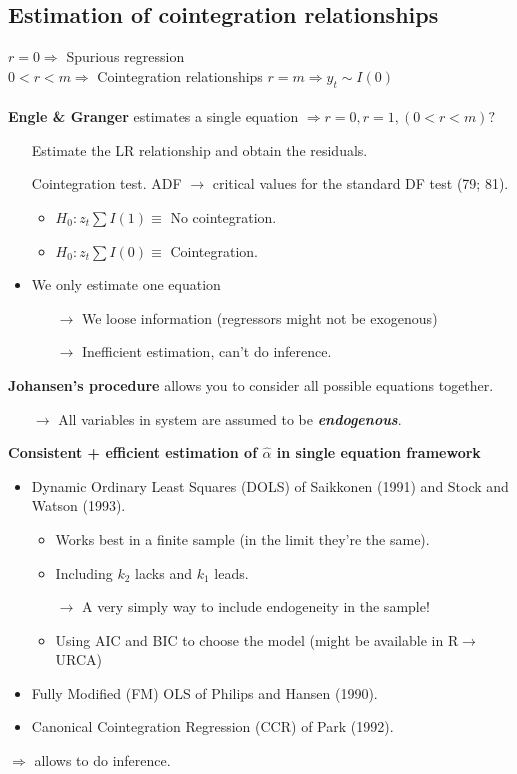 \begin{multicols}{2}
\subsection{Estimation of cointegration relationships}
$r=0\Rightarrow$ Spurious regression\\
$0<r<m\Rightarrow$ Cointegration relationships
$r=m\Rightarrow y_t\sim I(0)$
\\ \\
\textbf{Engle \& Granger} estimates a single equation $\Rightarrow r=0, r=1, (0<r<m)?$\\
\begin{itemize}
  \item[\nth{1}] Estimate the LR relationship and obtain the residuals.
  \item[\nth{2}] Cointegration test. ADF $\rightarrow$ critical values for the standard DF test (79; 81).
  \begin{itemize}
    \item $H_0: z_t\sum I(1)\equiv$ No cointegration.
    \item $H_0: z_t\sum I(0)\equiv$ Cointegration.
  \end{itemize}
  \item We only estimate one equation
  \begin{itemize}
    \item[$\rightarrow$] We loose information (regressors might not be exogenous)
    \item[$\rightarrow$] Inefficient estimation, can't do inference.
  \end{itemize}
\end{itemize}
\textbf{Johansen's procedure} allows you to consider all possible equations together.
\begin{itemize}
  \item[$\rightarrow$] All variables in system are assumed to be \textbf{\textit{endogenous}}.
\end{itemize}
\textbf{Consistent + efficient estimation of $\hat{\alpha}$ in single equation framework}
\begin{itemize}
  \item Dynamic Ordinary Least Squares (DOLS) of Saikkonen (1991) and Stock and Watson (1993).
  \begin{itemize}
    \item Works best in a finite sample (in the limit they're the same).
    \item Including $k_2$ lacks and $k_1$ leads.
    \item[$\rightarrow$] A very simply way to include endogeneity in the sample!
    \item Using AIC and BIC to choose the model (might be available in R$\rightarrow$URCA)
  \end{itemize}
  \item Fully Modified (FM) OLS of Philips and Hansen (1990).
  \item Canonical Cointegration Regression (CCR) of Park (1992).
\end{itemize}
$\Rightarrow$ allows to do inference.


\end{multicols}



